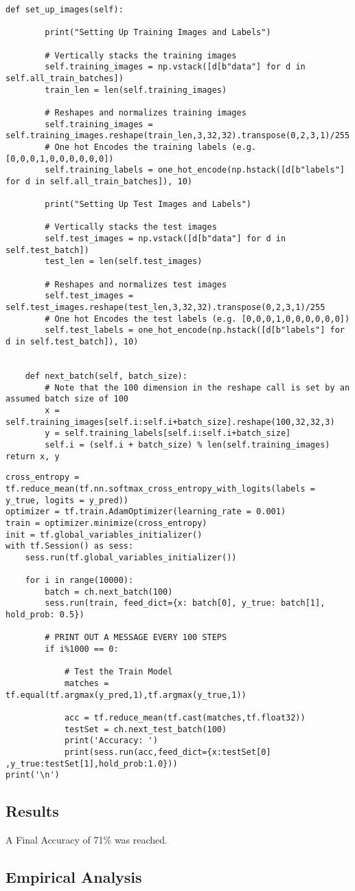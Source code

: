 \begin{lstlisting}[style=Python]
def set_up_images(self):
        
        print("Setting Up Training Images and Labels")
        
        # Vertically stacks the training images
        self.training_images = np.vstack([d[b"data"] for d in self.all_train_batches])
        train_len = len(self.training_images)
        
        # Reshapes and normalizes training images
        self.training_images = self.training_images.reshape(train_len,3,32,32).transpose(0,2,3,1)/255
        # One hot Encodes the training labels (e.g. [0,0,0,1,0,0,0,0,0,0])
        self.training_labels = one_hot_encode(np.hstack([d[b"labels"] for d in self.all_train_batches]), 10)
        
        print("Setting Up Test Images and Labels")
        
        # Vertically stacks the test images
        self.test_images = np.vstack([d[b"data"] for d in self.test_batch])
        test_len = len(self.test_images)
        
        # Reshapes and normalizes test images
        self.test_images = self.test_images.reshape(test_len,3,32,32).transpose(0,2,3,1)/255
        # One hot Encodes the test labels (e.g. [0,0,0,1,0,0,0,0,0,0])
        self.test_labels = one_hot_encode(np.hstack([d[b"labels"] for d in self.test_batch]), 10)

        
    def next_batch(self, batch_size):
        # Note that the 100 dimension in the reshape call is set by an assumed batch size of 100
        x = self.training_images[self.i:self.i+batch_size].reshape(100,32,32,3)
        y = self.training_labels[self.i:self.i+batch_size]
        self.i = (self.i + batch_size) % len(self.training_images)
return x, y
\end{lstlisting}

\begin{lstlisting}[style=Python]
cross_entropy = tf.reduce_mean(tf.nn.softmax_cross_entropy_with_logits(labels = y_true, logits = y_pred))
optimizer = tf.train.AdamOptimizer(learning_rate = 0.001)
train = optimizer.minimize(cross_entropy)
init = tf.global_variables_initializer()
with tf.Session() as sess:
    sess.run(tf.global_variables_initializer())

    for i in range(10000):
        batch = ch.next_batch(100)
        sess.run(train, feed_dict={x: batch[0], y_true: batch[1], hold_prob: 0.5})
        
        # PRINT OUT A MESSAGE EVERY 100 STEPS
        if i%1000 == 0:
            
            # Test the Train Model
            matches = tf.equal(tf.argmax(y_pred,1),tf.argmax(y_true,1))

            acc = tf.reduce_mean(tf.cast(matches,tf.float32))
            testSet = ch.next_test_batch(100)
            print('Accuracy: ')
            print(sess.run(acc,feed_dict={x:testSet[0] ,y_true:testSet[1],hold_prob:1.0}))
print('\n')
\end{lstlisting}

\subsection*{Results}
A Final Accuracy of 71\% was reached.

\subsection*{Empirical Analysis}
